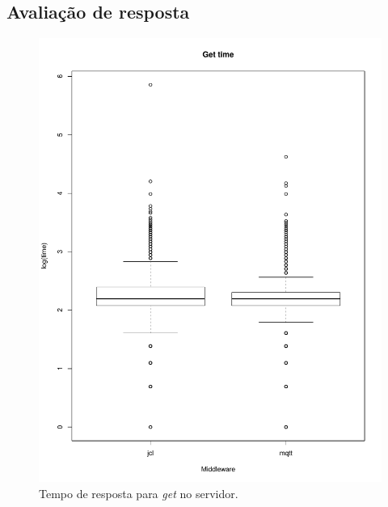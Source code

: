 \documentclass[12pt]{article}
\begin{document}
\subsection{Avaliação de resposta}\label{sec:time}

\begin{figure}
	\includegraphics[width=1\textwidth]{imgs/get-time}
	\caption{Tempo de resposta para \textit{get} no servidor.}
	\centering
	\label{fig:get}
\end{figure}
\end{document}
